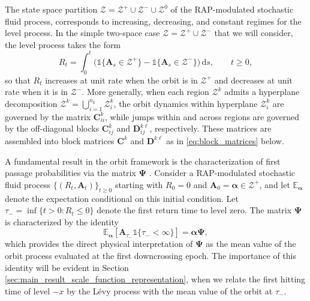 \documentclass[a4paper,11pt]{article}
\numberwithin{equation}{section}
\theoremstyle{plain}
\theoremstyle{definition}
\newcommand{\1}{\mathbf{1}}
\newcommand{\dd}{\mathrm{d}}
\begin{document}
The state space partition $\mathcal{Z} = \mathcal{Z}^+ \cup \mathcal{Z}^- \cup \mathcal{Z}^0$ of the RAP-modulated stochastic fluid process, corresponds to increasing, decreasing, and constant regimes for the level process. In the simple two-space case $\mathcal{Z} = \mathcal{Z}^+ \cup \mathcal{Z}^-$ that we will consider, the level process takes the form
\begin{equation}\label{eq:level_process}
R_t = \int_0^t \big(\mathds{1}\{\bm{A}_s \in \mathcal{Z}^+\} - \mathds{1}\{\bm{A}_s \in \mathcal{Z}^-\}\big)\,\dd s, \qquad t \ge 0,
\end{equation}
so that $R_t$ increases at unit rate when the orbit is in $\mathcal{Z}^+$ and decreases at unit rate when it is in $\mathcal{Z}^-$. More generally, when each region $\mathcal{Z}^k$ admits a hyperplane decomposition $\mathcal{Z}^k = \bigcup_{i=1}^{n_k} \mathcal{Z}_i^k$, the orbit dynamics within hyperplane $\mathcal{Z}_i^k$ are governed by the matrix $\bm{C}_{ii}^k$, while jumps within and across regions are governed by the off-diagonal blocks $\bm{C}_{ij}^k$ and $\bm{D}_{ij}^{k\ell}$, respectively. These matrices are assembled into block matrices $\bm{C}^k$ and $\bm{D}^{k\ell}$ as in \eqref{eq:block_matrices} below.


A fundamental result in the orbit framework is the characterization of first passage probabilities via the matrix $\bm{\Psi}$ \citep{BeanNguyenNielsenPeralta2022}. Consider a RAP-modulated stochastic fluid process $\{(R_t, \bm{A}_t)\}_{t \ge 0}$ starting with $R_0 = 0$ and $\bm{A}_0 = \bm{\alpha} \in \mathcal{Z}^+$, and let $\mathbb{E}_{\bm{\alpha}}$ denote the expectation conditional on this initial condition. Let $\tau_- = \inf\{t > 0 : R_t \le 0\}$ denote the first return time to level zero. The matrix $\bm{\Psi}$ is characterized by the identity
\begin{equation}\label{eq:psi_interpretation}
    \mathbb{E}_{\bm{\alpha}}[\bm{A}_{\tau_-} \mathds{1}\{\tau_- < \infty\}] = \bm{\alpha} \bm{\Psi},
\end{equation}
which provides the direct physical interpretation of $\bm{\Psi}$ as the mean value of the orbit process evaluated at the first downcrossing epoch.
The importance of this identity will be evident in Section \ref{sec:main_result_scale_function_representation}, when we relate the first hitting time of level $-x$ by the L\'evy process with the mean value of the orbit at $\tau_-$.
\end{document}
